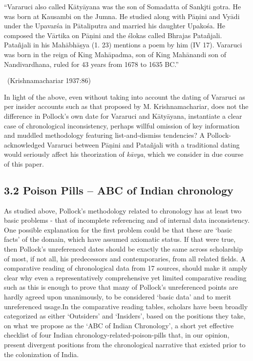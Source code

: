\begin{myquote}
“Vararuci also called Kātyāyana was the son of Somadatta of Sankjti gotra. He was born at Kausambi on the Jumna. He studied along with Pāṇini and Vyādi under the Upavarśa in Pātaliputra and married his daughter Upakośa. He composed the Vārtika on Pāṇini and the ślokas called Bhrajas Patañjali. Patañjali in his Mahābhāṣya (1. 23) mentions a poem by him (IV 17). Vararuci was born in the reign of King Mahāpadma, son of King Mahānandi son of Nandivardhana, ruled for 43 years from 1678 to 1635 BC.” 

~\hfill (Krishnamachariar 1937:86)
\end{myquote}

In light of the above, even without taking into account the dating of Vararuci as per insider accounts such as that proposed by M. Krishnamachariar, does not the difference in Pollock’s own date for Vararuci and Kātyāyana, instantiate a clear case of chronological inconsistency, perhaps willful omission of key information and muddled methodology featuring list-and-dismiss tendencies? A Pollock-acknowledged Vararuci between Pāṇini and Patañjali with a traditional dating would seriously affect his theorization of \textit{kāvya}, which we consider in due course of this paper.


\subsection*{3.2 Poison Pills – ABC of Indian chronology}

As studied above, Pollock’s methodology related to chronology has at least two basic problems - that of incomplete referencing and of internal data inconsistency. One possible explanation for the first problem could be that these are ‘basic facts’ of the domain, which have assumed axiomatic status. If that were true, then Pollock’s unreferenced dates should be exactly the same across scholarship of most, if not all, his predecessors and contemporaries, from all related fields. A comparative reading of chronological data from 17 sources, should make it amply clear why even a representatively comprehensive yet limited comparative reading such as this is enough to prove that many of Pollock’s unreferenced points are hardly agreed upon unanimously, to be considered ‘basic data’ and to merit unreferenced usage.In the comparative reading tables, scholars have been broadly categorized as either ‘Outsiders’ and ‘Insiders’, based on the positions they take, on what we propose as the ‘ABC of Indian Chronology’, a short yet effective checklist of four Indian chronology-related-poison-pills that, in our opinion, present divergent positions from the chronological narrative that existed prior to the colonization of India.

